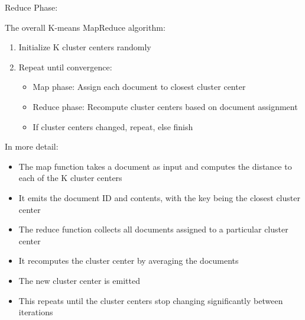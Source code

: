\documentclass[10pt, landscape]{article}
\begin{document}
\begin{multicols*}{4}
Reduce Phase:

\begin{Shaded}
\begin{Highlighting}[]
\OperatorTok{(}\OperatorTok{,}\OperatorTok{):}
  \OperatorTok{:}
  \OperatorTok{(}\OperatorTok{,} \OperatorTok{)}
\end{Highlighting}
\end{Shaded}

The overall K-means MapReduce algorithm:

\begin{enumerate}
\def\labelenumi{\arabic{enumi}.}
\tightlist
\item
  Initialize K cluster centers randomly
\item
  Repeat until convergence:

  \begin{itemize}
  \tightlist
  \item
    Map phase: Assign each document to closest cluster center
  \item
    Reduce phase: Recompute cluster centers based on document assignment
  \item
    If cluster centers changed, repeat, else finish
  \end{itemize}
\end{enumerate}

In more detail:

\begin{itemize}
\tightlist
\item
  The map function takes a document as input and computes the distance
  to each of the K cluster centers
\item
  It emits the document ID and contents, with the key being the closest
  cluster center
\item
  The reduce function collects all documents assigned to a particular
  cluster center
\item
  It recomputes the cluster center by averaging the documents
\item
  The new cluster center is emitted
\item
  This repeats until the cluster centers stop changing significantly
  between iterations
\end{itemize}


\end{multicols*}
\end{document}
